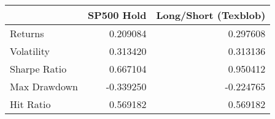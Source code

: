 \begin{tabular}{lrr}
\toprule
{} &  SP500 Hold &  Long/Short (Texblob) \\
\midrule
Returns      &    0.209084 &              0.297608 \\
Volatility   &    0.313420 &              0.313136 \\
Sharpe Ratio &    0.667104 &              0.950412 \\
Max Drawdown &   -0.339250 &             -0.224765 \\
Hit Ratio    &    0.569182 &              0.569182 \\
\bottomrule
\end{tabular}
